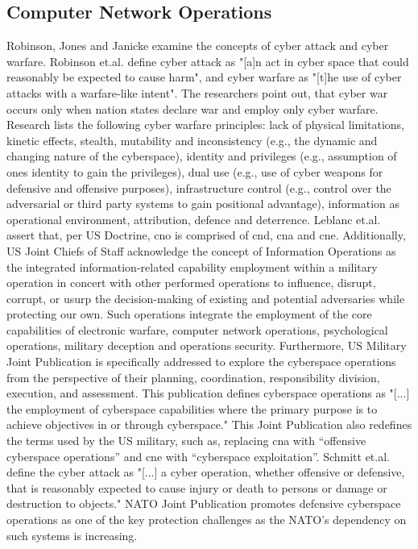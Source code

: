 \subsection{Computer Network Operations}
\label{sec:cno-work}
\glsresetall
Robinson, Jones and Janicke \cite{Robinson2015} examine the concepts of cyber attack and cyber warfare. Robinson et.al. define cyber attack as "[a]n act in cyber space that could reasonably be expected to cause harm", and cyber warfare as "[t]he use of cyber attacks with a warfare-like intent". The researchers point out, that cyber war occurs only when nation states declare war and employ only cyber warfare. Research lists the following cyber warfare principles: lack of physical limitations, kinetic effects, stealth, mutability and inconsistency (e.g., the dynamic and changing nature of the cyberspace), identity and privileges (e.g., assumption of ones identity to gain the privileges), dual use (e.g., use of cyber weapons for defensive and offensive purposes), infrastructure control (e.g., control over the adversarial or third party systems to gain positional advantage), information as operational environment, attribution, defence and deterrence.
Leblanc et.al. \cite{Leblanc2011} assert that, per US Doctrine, \gls{cno} is comprised of \gls{cnd}, \gls{cna} and \gls{cne}. 
Additionally, US Joint Chiefs of Staff \cite{USJCS2014} acknowledge the concept of Information Operations as the integrated information-related capability employment within a military operation in concert with other performed operations to influence, disrupt, corrupt, or usurp the decision-making of existing and potential adversaries while protecting our own. Such operations integrate the employment of the core capabilities of electronic warfare, computer network operations, psychological operations, military deception and operations security.
Furthermore, US Military Joint Publication \cite{USJCS2018} is specifically addressed to explore the cyberspace operations from the perspective of their planning, coordination, responsibility division, execution, and assessment. This publication defines cyberspace operations as "[...] the employment of cyberspace capabilities where the primary purpose is to achieve objectives in or through cyberspace." This Joint Publication also redefines the terms used by the US military, such as, replacing \gls{cna} with ``offensive cyberspace operations'' and \gls{cne} with ``cyberspace exploitation''.
Schmitt et.al. \cite{Schmitt2017} define the cyber attack as "[...] a cyber operation, whether offensive or defensive, that is reasonably expected to cause injury or death to persons or damage or destruction to objects."
NATO Joint Publication \cite{NATOJP2018} promotes defensive cyberspace operations as one of the key protection challenges as the NATO's dependency on such systems is increasing.

